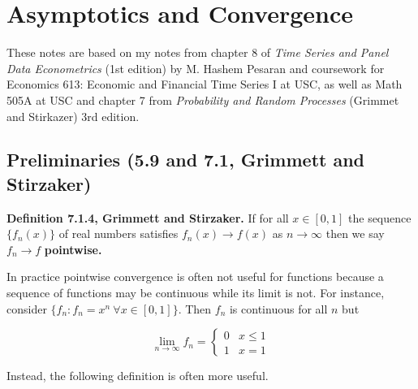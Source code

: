 %
%
%
%
%
%
%
%
%
%
%
%
%
%

\section{Asymptotics and Convergence}

These notes are based on my notes from chapter 8 of \textit{Time Series and Panel Data Econometrics} (1st edition) by M. Hashem Pesaran and coursework for Economics 613: Economic and Financial Time Series I at USC, as well as Math 505A at USC and chapter 7 from \textit{Probability and Random Processes} (Grimmet and Stirkazer) 3rd edition.


\subsection{Preliminaries (5.9 and 7.1, Grimmett and Stirzaker)}
\label{asym.preliminaries}

\begin{definition} \textbf{Definition 7.1.4, Grimmett and Stirzaker.} If for all \(x \in [0, 1]\) the sequence \(\{f_n(x)\}\) of real numbers satisfies \(f_n(x) \to f(x)\) as \(n \to \infty\) then we say \(f_n \to f\) \textbf{pointwise.}
\end{definition} 

\begin{remark} In practice pointwise convergence is often not useful for functions because a sequence of functions may be continuous while its limit is not. For instance, consider \(\{f_n: f_n = x^n \ \forall x \in [0, 1]\}\). Then \(f_n\) is continuous for all \(n\) but

\[
\lim_{n \to \infty} f_n = \begin{cases}
0 & x \leq 1 \\
1 & x = 1
\end{cases}
\]

Instead, the following definition is often more useful. \end{remark}

